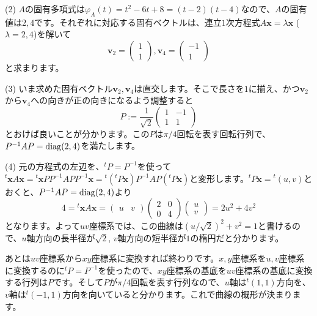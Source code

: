 \noindent (2) $A$の固有多項式は$\varphi_A(t) = t^2 - 6t + 8 = (t - 2)(t - 4)$なので、$A$の固有値は$2, 4$です。それぞれに対応する固有ベクトルは、連立$1$次方程式$A\bm{x} = \lambda\bm{x}$ ($\lambda = 2, 4$)を解いて
\[
\bm{v}_2 = 
\begin{pmatrix}
1 \\
1
\end{pmatrix}, 
\bm{v}_4 = 
\begin{pmatrix}
-1 \\
1
\end{pmatrix}
\]
と求まります。

\noindent (3) いま求めた固有ベクトル$\bm{v}_2, \bm{v}_4$は直交します。そこで長さを$1$に揃え、かつ$\bm{v}_2$から$\bm{v}_4$への向きが正の向きになるよう調整すると
\[
P := 
\frac{1}{\sqrt{2}}
\begin{pmatrix}
1 & -1 \\
1 & 1
\end{pmatrix}
\]
とおけば良いことが分かります。この$P$は$\pi/4$回転を表す回転行列で、$P^{-1} A P = \operatorname{diag}(2, 4)$を満たします。

\noindent (4) 元の方程式の左辺を、${}^tP = P^{-1}$を使って${}^t\bm{x} A \bm{x} = {}^t \bm{x} P P^{-1} A P P^{-1} \bm{x} = {}^t({}^tP \bm{x}) P^{-1} A P ({}^tP \bm{x})$と変形します。${}^tP \bm{x} = {}^t(u, v)$とおくと、$P^{-1} A P = \operatorname{diag}(2, 4)$より
\[
4 = {}^t\bm{x} A \bm{x} = 
\begin{pmatrix}
u & v
\end{pmatrix}
\begin{pmatrix}
2 & 0 \\
0 & 4
\end{pmatrix}
\begin{pmatrix}
u \\
v
\end{pmatrix}
= 2u^2 + 4v^2
\]
となります。よって$uv$座標系では、この曲線は$(u/\sqrt{2})^2 + v^2 = 1$と書けるので、$u$軸方向の長半径が$\sqrt{2}$, $v$軸方向の短半径が$1$の楕円だと分かります。

あとは$uv$座標系から$xy$座標系に変換すれば終わりです。$x, y$座標系を$u, v$座標系に変換するのに${}^tP = P^{-1}$を使ったので、$xy$座標系の基底を$uv$座標系の基底に変換する行列は$P$です。そして$P$が$\pi/4$回転を表す行列なので、$u$軸は${}^t(1, 1)$方向を、$v$軸は${}^t(-1, 1)$方向を向いていると分かります。これで曲線の概形が決まります。

